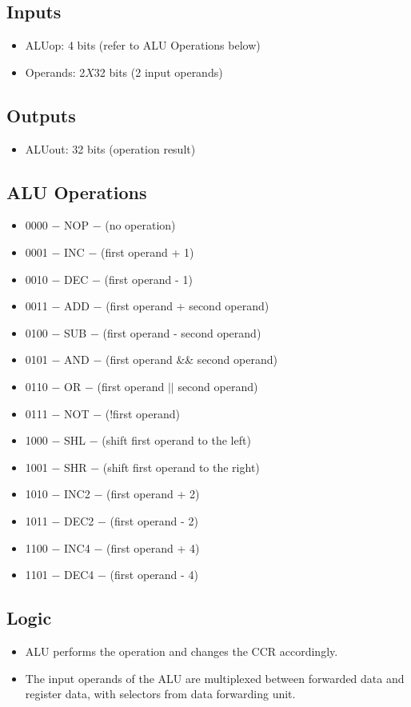 \documentclass[12pt]{report}
\begin{document}
\subsection{Inputs}
\begin{itemize}
    \item ALUop: 4 bits (refer to ALU Operations below)
    \item Operands: 2$X$32 bits (2 input operands)
\end{itemize}

\subsection{Outputs}
\begin{itemize}
    \item ALUout: 32 bits (operation result)
\end{itemize}

\subsection{ALU Operations}
\begin{itemize}
    \item 0000 $-$ NOP $-$ (no operation)
    \item 0001 $-$ INC $-$ (first operand + 1)
    \item 0010 $-$ DEC $-$ (first operand - 1)
    \item 0011 $-$ ADD $-$ (first operand + second operand)
    \item 0100 $-$ SUB $-$ (first operand - second operand)
    \item 0101 $-$ AND $-$ (first operand \&\& second operand)
    \item 0110 $-$ OR $-$ (first operand $||$ second operand)
    \item 0111 $-$ NOT $-$ (!first operand)
    \item 1000 $-$ SHL $-$ (shift first operand to the left)
    \item 1001 $-$ SHR $-$ (shift first operand to the right)
    \item 1010 $-$ INC2 $-$ (first operand + 2)
    \item 1011 $-$ DEC2 $-$ (first operand - 2)
    \item 1100 $-$ INC4 $-$ (first operand + 4)
    \item 1101 $-$ DEC4 $-$ (first operand - 4)
\end{itemize}

\subsection{Logic}
\begin{itemize}
    \item ALU performs the operation and changes the CCR accordingly.
    \item The input operands of the ALU are multiplexed between forwarded data and register data, with selectors from data forwarding unit.
\end{itemize}
\end{document}
